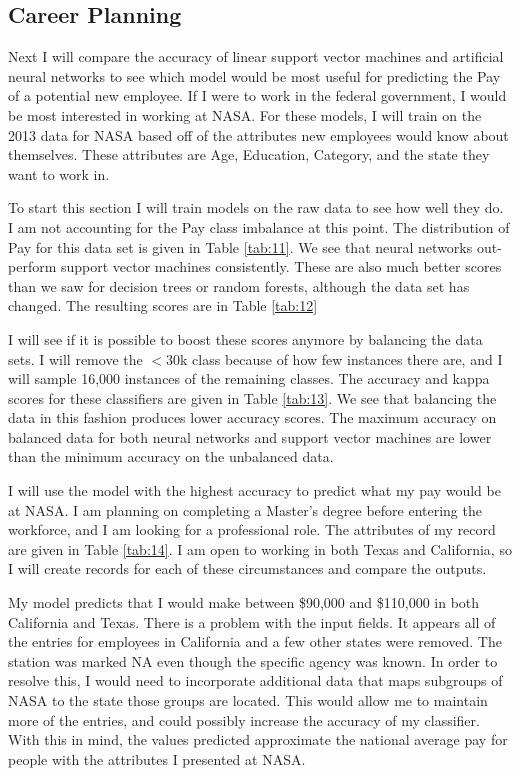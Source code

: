 \documentclass{article}
\begin{document}
    \subsection{Career Planning}
    Next I will compare the accuracy of linear support vector machines and artificial neural networks to see which model would be most useful for predicting the Pay of a potential new employee. If I were to work in the federal government, I would be most interested in working at NASA. For these models, I will train on the 2013 data for NASA based off of the attributes new employees would know about themselves. These attributes are Age, Education, Category, and the state they want to work in.
    \par
    To start this section I will train models on the raw data to see how well they do. I am not accounting for the Pay class imbalance at this point. The distribution of Pay for this data set is given in Table \ref{tab:11}. We see that neural networks out-perform support vector machines consistently. These are also much better scores than we saw for decision trees or random forests, although the data set has changed. The resulting scores are in Table \ref{tab:12}
    \par
    I will see if it is possible to boost these scores anymore by balancing the data sets. I will remove the $<$30k class because of how few instances there are, and I will sample 16,000 instances of the remaining classes. The accuracy and kappa scores for these classifiers are given in Table \ref{tab:13}. We see that balancing the data in this fashion produces lower accuracy scores. The maximum accuracy on balanced data for both neural networks and support vector machines are lower than the minimum accuracy on the unbalanced data.
    \par
    I will use the model with the highest accuracy to predict what my pay would be at NASA. I am planning on completing a Master's degree before entering the workforce, and I am looking for a professional role. The attributes of my record are given in Table \ref{tab:14}. I am open to working in both Texas and California, so I will create records for each of these circumstances and compare the outputs.
    \par
    My model predicts that I would make between \$90,000 and \$110,000 in both California and Texas. There is a problem with the input fields. It appears all of the entries for employees in California and a few other states were removed. The station was marked NA even though the specific agency was known. In order to resolve this, I would need to incorporate additional data that maps subgroups of NASA to the state those groups are located. This would allow me to maintain more of the entries, and could possibly increase the accuracy of my classifier. With this in mind, the values predicted approximate the national average pay for people with the attributes I presented at NASA.
\end{document}
